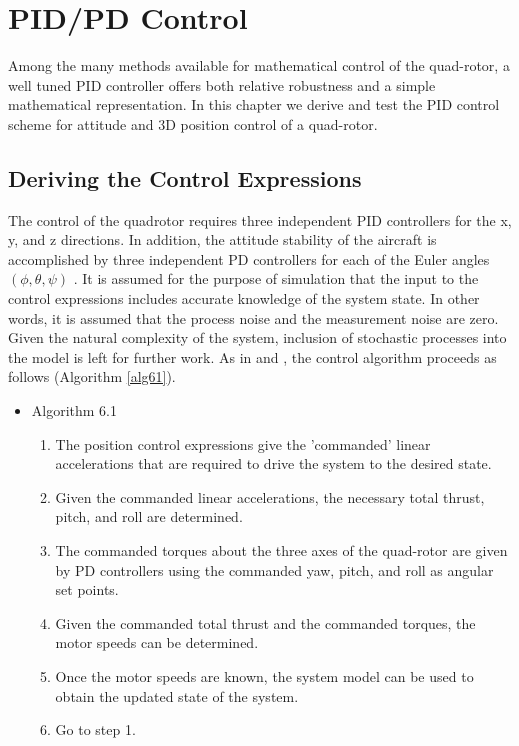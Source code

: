 
\chapter{PID/PD Control} %

\label{Chapter6} %


Among the many methods available for mathematical control of the quad-rotor, a well tuned PID controller offers both relative robustness and a simple mathematical representation. In this chapter we derive and test the PID control scheme for attitude and 3D position control of a quad-rotor.


\section{Deriving the Control Expressions}

The control of the quadrotor requires three independent PID controllers for the x, y, and z directions. In addition, the attitude stability of the aircraft is accomplished by three independent PD controllers for each of the Euler angles $(\phi,\theta,\psi)$ . It is assumed for the purpose of simulation that the input to the control expressions includes accurate knowledge of the system state. In other words, it is assumed that the process noise and the measurement noise are zero. Given the natural complexity of the system, inclusion of stochastic processes into the model is left for further work. As in \cite{Luukkonen} and \cite{bouabdallah2004pid}, the control algorithm proceeds as follows (Algorithm \ref{alg61}).

\begin{itemize}
\label{alg61}
\item Algorithm 6.1
    \begin{enumerate}
    \item The position control expressions give the 'commanded' linear accelerations that are required to drive the system to the desired state.
    \item Given the commanded linear accelerations, the necessary total thrust, pitch, and roll are determined.
    \item The commanded torques about the three axes of the quad-rotor are given by PD controllers using the commanded yaw, pitch, and roll as angular set points.
    \item Given the commanded total thrust and the commanded torques, the motor speeds can be determined.
    \item Once the motor speeds are known, the system model can be used to obtain the updated state of the system.
    \item Go to step 1.
    \end{enumerate}
\end{itemize}


